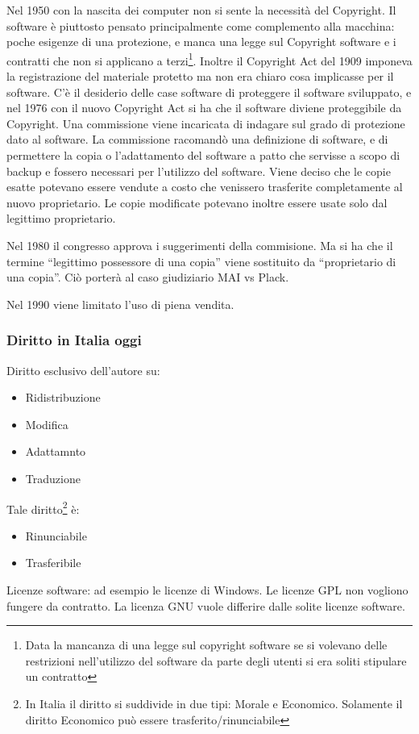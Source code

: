 Nel 1950 con la nascita dei computer non si sente la necessit\`a del Copyright. Il software \`e piuttosto pensato principalmente come complemento alla macchina: poche esigenze di una protezione, e manca una legge sul Copyright software e i contratti che non si applicano a terzi\footnote{Data la mancanza di una legge sul copyright software se si volevano delle restrizioni nell'utilizzo del software da parte degli utenti si era soliti stipulare un contratto}. Inoltre il Copyright Act del 1909 imponeva la registrazione del materiale protetto ma non era chiaro cosa implicasse per il software.
C'\`e il desiderio delle case software di proteggere il software sviluppato, e nel 1976 con il nuovo Copyright Act si ha che il software diviene proteggibile da Copyright. Una commissione viene incaricata di indagare sul grado di protezione dato al software. La commissione racomand\`o una definizione di software, e di permettere la copia o l'adattamento del software a patto che servisse a scopo di backup e fossero necessari per l'utilizzo del software. Viene deciso che le copie esatte potevano essere vendute a costo che venissero trasferite completamente al nuovo proprietario. Le copie modificate potevano inoltre essere usate solo dal legittimo proprietario.

Nel 1980 il congresso approva i suggerimenti della commisione. Ma si ha che il termine ``legittimo possessore di una copia'' viene sostituito da ``proprietario di una copia''. Ci\`o porter\`a al caso giudiziario MAI vs Plack.

Nel 1990 viene limitato l'uso di piena vendita.

\subsubsection{Diritto in Italia oggi}

Diritto esclusivo dell'autore su:
\begin{itemize}

\item Ridistribuzione
\item Modifica
\item Adattamnto
\item Traduzione

\end{itemize}

Tale diritto\footnote{In Italia il diritto si suddivide in due tipi: Morale e Economico. Solamente il diritto Economico pu\`o essere trasferito/rinunciabile} \`e:
\begin{itemize}

\item Rinunciabile
\item Trasferibile

\end{itemize}

Licenze software: ad esempio le licenze di Windows. Le licenze GPL non vogliono fungere da contratto. La licenza GNU vuole differire dalle solite licenze software.
